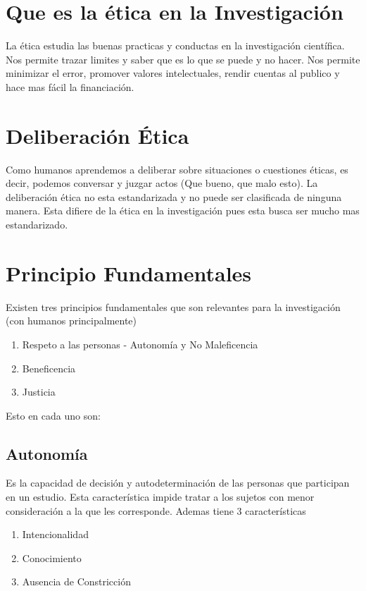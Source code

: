


    

    \section*{Que es la ética en la Investigación}

    La ética estudia las buenas practicas y conductas en la investigación científica. Nos permite trazar limites y saber que es lo que se puede y no hacer. Nos permite minimizar el error, promover valores intelectuales, rendir cuentas al publico y hace mas fácil la financiación.

    \section*{Deliberación Ética}

    Como humanos aprendemos a deliberar sobre situaciones o cuestiones éticas, es decir, podemos conversar y juzgar actos (Que bueno, que malo esto). La deliberación ética no esta estandarizada y no puede ser clasificada de ninguna manera. Esta difiere de la ética en la investigación pues esta busca ser mucho mas estandarizado.

    \section*{Principio Fundamentales}
    Existen tres principios fundamentales que son relevantes para la investigación (con humanos principalmente)
    \begin{enumerate}
      \item Respeto a las personas - Autonomía y No Maleficencia
      \item Beneficencia
      \item Justicia
    \end{enumerate}
    Esto en cada uno son:
    \subsection*{Autonomía}
    Es la capacidad de decisión y autodeterminación de las personas que participan en un estudio. Esta característica impide tratar a los sujetos con menor consideración a la que les corresponde. Ademas tiene 3 características
    \begin{enumerate}
      \item Intencionalidad
      \item Conocimiento
      \item Ausencia de Constricción
    \end{enumerate}

